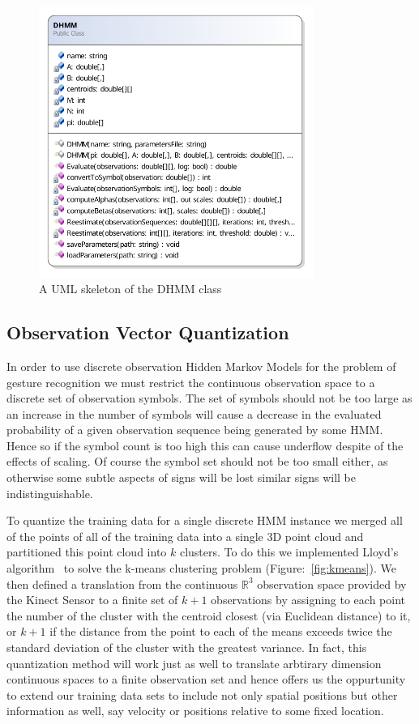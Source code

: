 \begin{figure}[h!]
        \centering
        \includegraphics[width=0.8\textwidth]{ThesisFigs/DHMMDiag}
        \caption{A UML skeleton of the DHMM class}\label{fig:dhmmdiag}
\end{figure}

\subsection{Observation Vector Quantization}
In order to use discrete observation Hidden Markov Models for the problem of gesture recognition we must restrict the continuous observation space to a discrete set of observation symbols. The set of symbols should not be too large as an increase in the number of symbols will cause a decrease in the evaluated probability of a given observation sequence being generated by some HMM. Hence so if the symbol count is too high this can cause underflow despite of the effects of scaling. Of course the symbol set should not be too small either, as otherwise some subtle aspects of signs will be lost similar signs will be indistinguishable.

To quantize the training data for a single discrete HMM instance we merged all of the points of all of the training data into a single 3D point cloud and partitioned this point cloud into $k$ clusters. To do this we implemented Lloyd's algorithm~\citep{lloyd1982least} to solve the k-means clustering problem (Figure:~\ref{fig:kmeans}). We then defined a translation from the continuous $\mathbb{R}^3$ observation space provided by the Kinect Sensor to a finite set of $k+1$ observations by assigning to each point the number of the cluster with the centroid closest (via Euclidean distance) to it, or $k+1$ if the distance from the point to each of the means exceeds twice the standard deviation of the cluster with the greatest variance. In fact, this quantization method will work just as well to translate arbtirary dimension continuous spaces to a finite observation set and hence offers us the oppurtunity to extend our training data sets to include not only spatial positions but other information as well, say velocity or positions relative to some fixed location.

